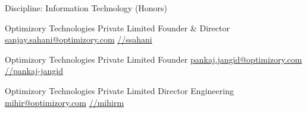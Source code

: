 




\divider


\divider





Discipline: Information Technology (Honors)


{Optimizory Technologies Private Limited}
{Founder \& Director}
{\href{mailto:sanjay.sahani@optimizory.com}{sanjay.sahani@optimizory.com}}
{\href{https://www.linkedin.com/in/ssahani}{//ssahani}}

\divider

{Optimizory Technologies Private Limited}
{Founder}
{\href{mailto:pankaj.jangid@optimizory.com}{pankaj.jangid@optimizory.com}}
{\href{https://www.linkedin.com/in/pankaj-jangid}{//pankaj-jangid}}

\divider

{Optimizory Technologies Private Limited}
{Director Engineering}
{\href{mailto:mihir@optimizory.com}{mihir@optimizory.com}}
{\href{https://www.linkedin.com/in/mihirm}{//mihirm}}





